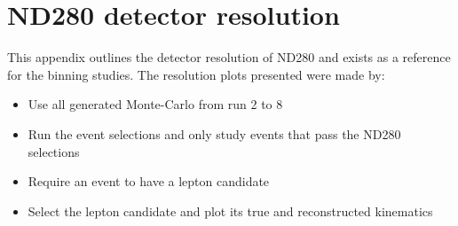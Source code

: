 \chapter{ND280 detector resolution}
\label{appendix:detector_resolution}
This appendix outlines the detector resolution of ND280 and exists as a reference for the binning studies. The resolution plots presented were made by:
\begin{itemize}
	\item Use all generated Monte-Carlo from run 2 to 8
	\item Run the event selections and only study events that pass the ND280 selections
	\item Require an event to have a lepton candidate
	\item Select the lepton candidate and plot its true and reconstructed kinematics
\end{itemize}


